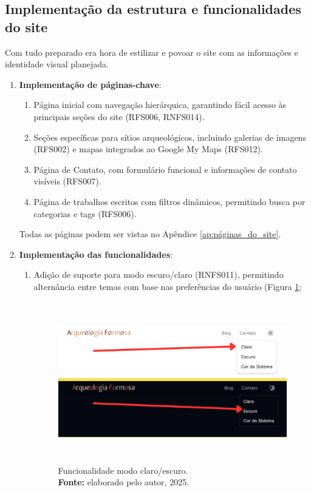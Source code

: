     \subsection{Implementação da estrutura e funcionalidades do site}
    Com tudo preparado era hora de estilizar e povoar o site com as informações e identidade visual planejada.
    \begin{enumerate}
        \item \textbf{Implementação de páginas-chave}:
        \begin{enumerate}
            \item Página inicial com navegação hierárquica, garantindo fácil acesso às principais seções do site (RFS006, RNFS014).
            \item Seções específicas para sítios arqueológicos, incluindo galerias de imagens (RFS002) e mapas integrados ao Google My Maps (RFS012).
            \item Página de Contato, com formulário funcional e informações de contato visíveis (RFS007).
            \item Página de trabalhos escritos com filtros dinâmicos, permitindo busca por categorias e tags (RFS006).
            \end{enumerate}
            Todas as páginas podem ser vistas no Apêndice \ref{ap:páginas_do_site}.
        \item \textbf{Implementação das funcionalidades}:
            \begin{enumerate}
            \item Adição de suporte para modo escuro/claro (RNFS011), permitindo alternância entre temas com base nas preferências do usuário (Figura \ref{fig:claro escuro};

                    \begin{figure}[H]
                        \centering
                        \includegraphics[height=7cm, keepaspectratio]{img/site/claro escuro.png}
                        \caption{ Funcionalidade modo claro/escuro. \\
                            \textbf{Fonte:} elaborado pelo autor, 2025.}
                        \label{fig:claro escuro}
                    \end{figure}
                                

\end{enumerate}
\end{enumerate}
